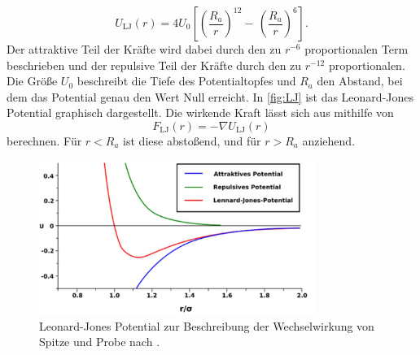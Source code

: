 \begin{equation}
  U_{\text{LJ}}(r) = 4U_0\left[\left(\frac{R_a}{r}\right)^{12}-\,\left(\frac{R_a}{r}\right)^6\right].
\end{equation}
Der attraktive Teil der Kräfte wird dabei durch den zu $r^{-6}$ proportionalen Term beschrieben und der repulsive Teil der Kräfte durch den zu $r^{-12}$ proportionalen.
Die Größe $U_0$ beschreibt die Tiefe des Potentialtopfes und $R_a$ den Abstand, bei dem das Potential genau den Wert Null erreicht. In \autoref{fig:LJ} ist das Leonard-Jones Potential graphisch dargestellt.
Die wirkende Kraft lässt sich aus mithilfe von
\begin{equation}
  F_{\text{LJ}}(r) = - \nabla U_{\text{LJ}}(r)
\end{equation}
berechnen. Für $r<R_a$ ist diese abstoßend, und für $r>R_a$ anziehend.
\begin{figure}[H]
  \centering
  \includegraphics[width=0.8\textwidth]{content/plots/LJ.jpg}
  \caption{Leonard-Jones Potential zur Beschreibung der Wechselwirkung von Spitze und Probe nach \cite{Voigt}.}
  \label{fig:LJ}
\end{figure}
